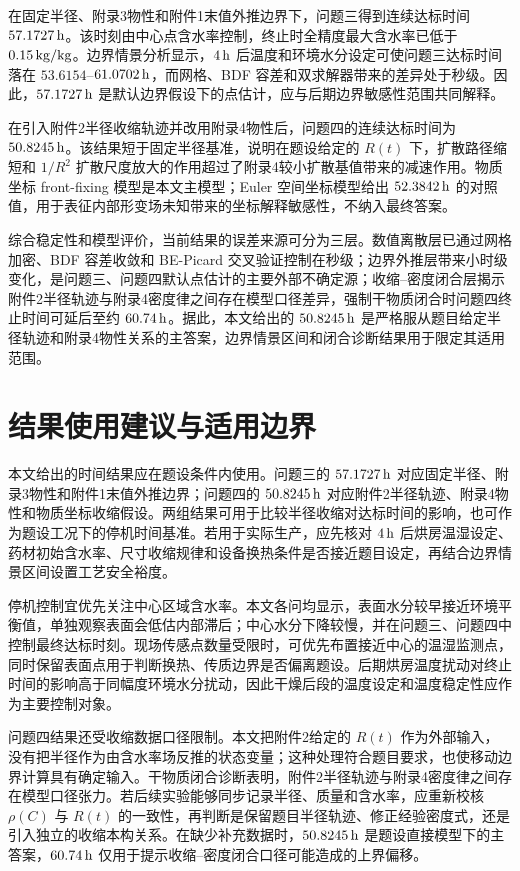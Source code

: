 \documentclass[UTF8,a4paper,12pt]{ctexart}
\numberwithin{equation}{section}
\begin{document}
在固定半径、附录3物性和附件1末值外推边界下，问题三得到连续达标时间 $57.1727\rm\,h$。该时刻由中心点含水率控制，终止时全精度最大含水率已低于 $0.15\rm\,kg/kg$。边界情景分析显示，$4\rm\,h$ 后温度和环境水分设定可使问题三达标时间落在 $53.6154$--$61.0702\rm\,h$，而网格、BDF 容差和双求解器带来的差异处于秒级。因此，$57.1727\rm\,h$ 是默认边界假设下的点估计，应与后期边界敏感性范围共同解释。

在引入附件2半径收缩轨迹并改用附录4物性后，问题四的连续达标时间为 $50.8245\rm\,h$。该结果短于固定半径基准，说明在题设给定的 $R(t)$ 下，扩散路径缩短和 $1/R^2$ 扩散尺度放大的作用超过了附录4较小扩散基值带来的减速作用。物质坐标 front-fixing 模型是本文主模型；Euler 空间坐标模型给出 $52.3842\rm\,h$ 的对照值，用于表征内部形变场未知带来的坐标解释敏感性，不纳入最终答案。

综合稳定性和模型评价，当前结果的误差来源可分为三层。数值离散层已通过网格加密、BDF 容差收敛和 BE-Picard 交叉验证控制在秒级；边界外推层带来小时级变化，是问题三、问题四默认点估计的主要外部不确定源；收缩--密度闭合层揭示附件2半径轨迹与附录4密度律之间存在模型口径差异，强制干物质闭合时问题四终止时间可延后至约 $60.74\rm\,h$。据此，本文给出的 $50.8245\rm\,h$ 是严格服从题目给定半径轨迹和附录4物性关系的主答案，边界情景区间和闭合诊断结果用于限定其适用范围。
\section{结果使用建议与适用边界}
本文给出的时间结果应在题设条件内使用。问题三的 $57.1727\rm\,h$ 对应固定半径、附录3物性和附件1末值外推边界；问题四的 $50.8245\rm\,h$ 对应附件2半径轨迹、附录4物性和物质坐标收缩假设。两组结果可用于比较半径收缩对达标时间的影响，也可作为题设工况下的停机时间基准。若用于实际生产，应先核对 $4\rm\,h$ 后烘房温湿设定、药材初始含水率、尺寸收缩规律和设备换热条件是否接近题目设定，再结合边界情景区间设置工艺安全裕度。

停机控制宜优先关注中心区域含水率。本文各问均显示，表面水分较早接近环境平衡值，单独观察表面会低估内部滞后；中心水分下降较慢，并在问题三、问题四中控制最终达标时刻。现场传感点数量受限时，可优先布置接近中心的温湿监测点，同时保留表面点用于判断换热、传质边界是否偏离题设。后期烘房温度扰动对终止时间的影响高于同幅度环境水分扰动，因此干燥后段的温度设定和温度稳定性应作为主要控制对象。

问题四结果还受收缩数据口径限制。本文把附件2给定的 $R(t)$ 作为外部输入，没有把半径作为由含水率场反推的状态变量；这种处理符合题目要求，也使移动边界计算具有确定输入。干物质闭合诊断表明，附件2半径轨迹与附录4密度律之间存在模型口径张力。若后续实验能够同步记录半径、质量和含水率，应重新校核 $\rho(C)$ 与 $R(t)$ 的一致性，再判断是保留题目半径轨迹、修正经验密度式，还是引入独立的收缩本构关系。在缺少补充数据时，$50.8245\rm\,h$ 是题设直接模型下的主答案，$60.74\rm\,h$ 仅用于提示收缩--密度闭合口径可能造成的上界偏移。
\end{document}
